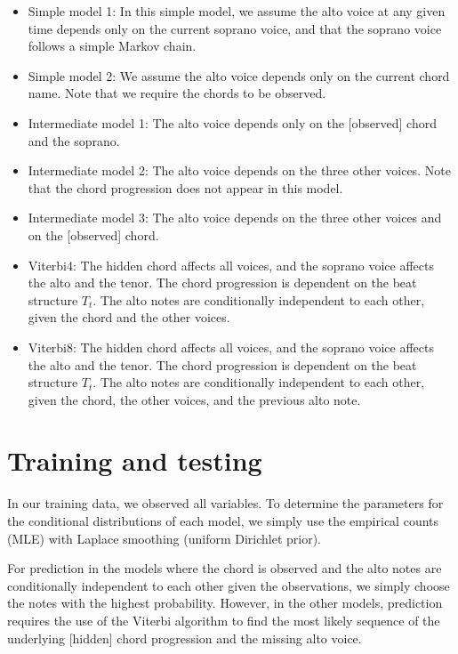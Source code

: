 \documentclass[11pt]{article}
\begin{document}
\begin{itemize}
\item Simple model 1:
In this simple model, we assume the alto voice at any given time depends only on the current soprano voice, and that the soprano voice follows a simple Markov chain.
\item Simple model 2:
We assume the alto voice depends only on the current chord name. Note that we require the chords to be observed.
\item Intermediate model 1:
The alto voice depends only on the [observed] chord and the soprano.
\item Intermediate model 2:
The alto voice depends on the three other voices. Note that the chord progression does not appear in this model.
\item Intermediate model 3:
The alto voice depends on the three other voices and on the [observed] chord.
\item  Viterbi4:
The hidden chord affects all voices, and the soprano voice affects the alto and the tenor. The chord progression is dependent on the beat structure $T_t$. The alto notes are conditionally independent to each other, given the chord and the other voices.
\item Viterbi8:
The hidden chord affects all voices, and the soprano voice affects the alto and the tenor. The chord progression is dependent on the beat structure $T_t$. The alto notes are conditionally independent to each other, given the chord, the other voices, and the previous alto note.
\end{itemize}

\section{Training and testing}

In our training data, we observed all variables. To determine the parameters for the conditional distributions of each model, we simply use the empirical counts (MLE) with Laplace smoothing (uniform Dirichlet prior).

For prediction in the models where the chord is observed and the alto notes are conditionally independent to each other given the observations, we simply choose the notes with the highest probability. However, in the other models, prediction requires the use of the Viterbi algorithm to find the most likely sequence of the underlying [hidden] chord progression and the missing alto voice.
\end{document}
